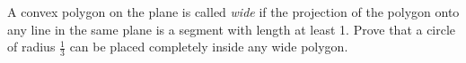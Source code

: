 A convex polygon on the plane is called \textit{wide} if the projection of the polygon onto any line in the same plane is a segment with length at least 1. Prove that a circle of radius $\tfrac{1}{3}$ can be placed completely inside any wide polygon.